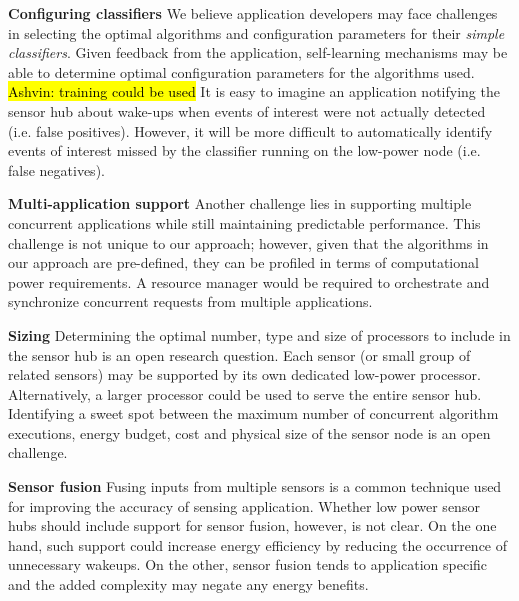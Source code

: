 {\bf Configuring classifiers} We believe application developers may
face challenges in selecting the optimal algorithms and configuration
parameters for their {\em simple classifiers}. Given feedback from the
application, self-learning mechanisms may be able to determine optimal
configuration parameters for the algorithms used. \hl{Ashvin: training
  could be used} It is easy to imagine an application notifying the
sensor hub about wake-ups when events of interest were not actually
detected (i.e.  false positives).  However, it will be more difficult
to automatically identify events of interest missed by the classifier
running on the low-power node (i.e. false negatives).

{\bf Multi-application support} Another challenge lies in supporting
multiple concurrent applications while still maintaining predictable
performance.  This challenge is not unique to our approach; however,
given that the algorithms in our approach are pre-defined, they can be
profiled in terms of computational power requirements. A resource
manager would be required to orchestrate and synchronize concurrent
requests from multiple applications.

{\bf Sizing} Determining the optimal number, type and size of
processors to include in the sensor hub is an open research question.
Each sensor (or small group of related sensors) may be supported by
its own dedicated low-power processor. Alternatively, a larger
processor could be used to serve the entire sensor hub.  Identifying a
sweet spot between the maximum number of concurrent algorithm
executions, energy budget, cost and physical size of the sensor node
is an open challenge.

{\bf Sensor fusion} Fusing inputs from multiple sensors is a common
technique used for improving the accuracy of sensing application.
Whether low power sensor hubs should include support for sensor
fusion, however, is not clear.  On the one hand, such support could
increase energy efficiency by reducing the occurrence of unnecessary
wakeups.  On the other, sensor fusion tends to application specific
and the added complexity may negate any energy benefits.


